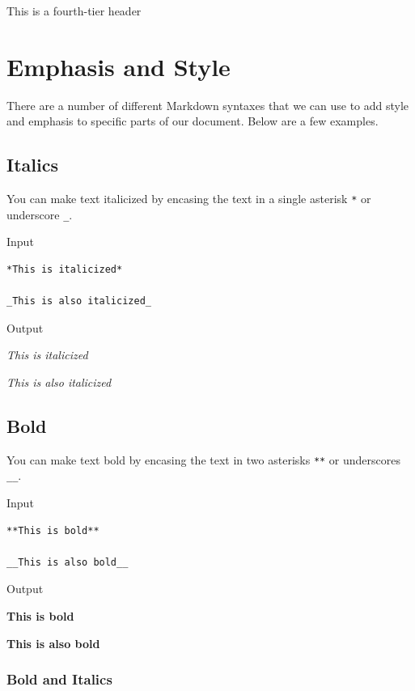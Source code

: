\documentclass[
]{book}
\begin{document}
This is a fourth-tier header

\section{Emphasis and Style}\label{emphasis-and-style}

There are a number of different Markdown syntaxes that we can use to add style and emphasis to specific parts of our document. Below are a few examples.

\subsection*{Italics}\label{italics}

You can make text italicized by encasing the text in a single asterisk \texttt{*} or underscore \texttt{\_}.

Input

\begin{verbatim}
*This is italicized*

_This is also italicized_
\end{verbatim}

Output

\emph{This is italicized}

\emph{This is also italicized}

\subsection*{Bold}\label{bold}

You can make text bold by encasing the text in two asterisks \texttt{**} or underscores
\texttt{\_\_}.

Input

\begin{verbatim}
**This is bold**

__This is also bold__
\end{verbatim}

Output

\textbf{This is bold}

\textbf{This is also bold}

\subsubsection*{Bold and Italics}\label{bold-and-italics}
\end{document}
